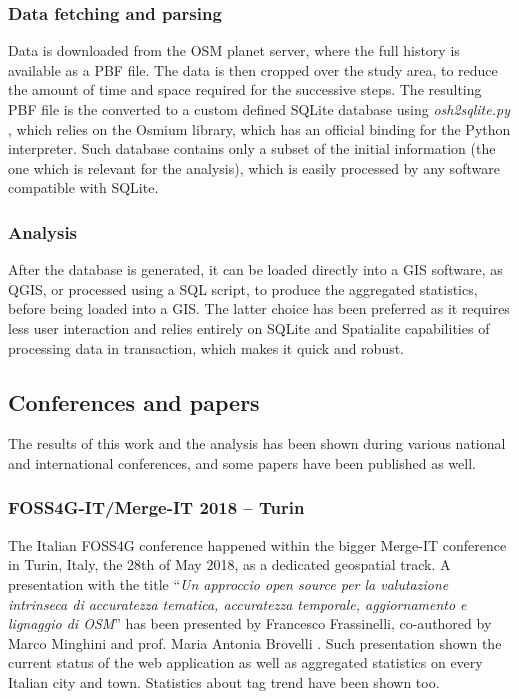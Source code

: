 \documentclass{Configuration_Files/PoliMi3i_thesis}
\begin{document}
\subsubsection{Data fetching and parsing}

Data is downloaded from the OSM planet server, where the full history is available as a PBF file. The data is then cropped over the study area, to reduce the amount of time and space required for the successive steps. The resulting PBF file is the converted to a custom defined SQLite database using \textit{osh2sqlite.py} \cite{262588213843476OSMNodeHistory}, which relies on the Osmium library, which has an official binding for the Python interpreter. Such database contains only a subset of the initial information (the one which is relevant for the analysis), which is easily processed by any software compatible with SQLite.

\subsubsection{Analysis}

After the database is generated, it can be loaded directly into a GIS software, as QGIS, or processed using a SQL script, to produce the aggregated statistics, before being loaded into a GIS. The latter choice has been preferred \cite{262588213843476ProcessingDatabasesGenerated}as it requires less user interaction and relies entirely on SQLite and Spatialite capabilities of processing data in transaction, which makes it quick and robust.

\subsection{Conferences and papers}

The results of this work and the analysis has been shown during various national and international conferences, and some papers have been published as well.

\subsubsection{FOSS4G-IT/Merge-IT 2018 – Turin}

The Italian FOSS4G conference happened within the bigger Merge-IT conference in Turin, Italy, the 28th of May 2018, as a dedicated geospatial track.
A presentation with the title “\textit{Un approccio open source per la valutazione intrinseca di accuratezza tematica, accuratezza temporale, aggiornamento e lignaggio di OSM}” has been presented by Francesco Frassinelli, co-authored by Marco Minghini and prof. Maria Antonia Brovelli \cite{frassinelliApproccioOpenSource2018}.
Such presentation shown the current status of the web application as well as aggregated statistics on every Italian city and town. Statistics about tag trend have been shown too.
\end{document}
